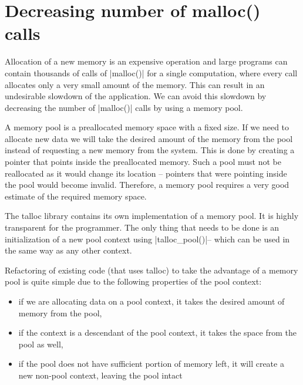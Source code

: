 \section{Decreasing number of malloc() calls}
\label{talloc:pool}

Allocation of a new memory is an expensive operation and large programs can
contain thousands of calls of |malloc()| for a single computation, where every
call allocates only a very small amount of the memory. This can result in an
undesirable slowdown of the application. We can avoid this slowdown by
decreasing the number of |malloc()| calls by using a memory pool.

A memory pool is a preallocated memory space with a fixed size. If we need to
allocate new data we will take the desired amount of the memory from the pool
instead of requesting a new memory from the system. This is done by creating a
pointer that points inside the preallocated memory. Such a pool must not be
reallocated as it would change its location -- pointers that were pointing
inside the pool would become invalid. Therefore, a memory pool requires a very
good estimate of the required memory space.

The talloc library contains its own implementation of a memory pool. It is
highly transparent for the programmer. The only thing that needs to be done is
an initialization of a new pool context using |talloc_pool()|\footnotemark --
which can be used in the same way as any other context.


Refactoring of existing code (that uses talloc) to take the advantage of a
memory pool is quite simple due to the following properties of the pool context:

\begin{itemize}
  \item if we are allocating data on a pool context, it takes the desired
  amount of memory from the pool,
  \item if the context is a descendant of the pool context, it takes the space
  from the pool as well,
  \item if the pool does not have sufficient portion of memory left, it will
  create a new non-pool context, leaving the pool intact
\end{itemize}

